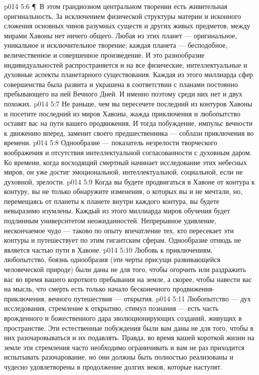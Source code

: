 \vs p014 5:6 \P\ В этом грандиозном центральном творении есть живительная оригинальность. За исключением физической структуры материи и исконного сложения основных чинов разумных существ и других живых предметов, между мирами Хавоны нет ничего общего. Любая из этих планет --- оригинальное, уникальное и исключительное творение; каждая планета --- бесподобное, величественное и совершенное произведение. И это разнообразие индивидуальностей распространяется и на все физические, интеллектуальные и духовные аспекты планетарного существования. Каждая из этого миллиарда сфер совершенства была развита и украшена в соответствии с планами постоянно пребывающего на ней Вечного Дней. И именно поэтому среди них нет и двух похожих.
\vs p014 5:7 Не раньше, чем вы пересечете последний из контуров Хавоны и посетите последний из миров Хавоны, жажда приключения и любопытство оставят вас на пути вашего продвижения. И тогда побуждение, импульс вечности к движению вперед, заменит своего предшественника --- соблазн приключения во времени.
\vs p014 5:8 Однообразие --- показатель незрелости творческого воображения и отсутствия интеллектуальной согласованности с духовным даром. Ко времени, когда восходящий смертный начинает исследование этих небесных миров, он уже достиг эмоциональной, интеллектуальной, социальной, если не духовной, зрелости.
\vs p014 5:9 Когда вы будете продвигаться в Хавоне от контура к контуру, вы не только обнаружите изменения, о которых вы и не мечтали, но, перемещаясь от планеты к планете внутри каждого контура, вы будете невыразимо изумлены. Каждый из этого миллиарда миров обучения будет подлинным университетом неожиданностей. Непрерывное удивление, нескончаемое чудо --- таково по опыту впечатление тех, кто пересекает эти контуры и путешествует по этим гигантским сферам. Однообразие отнюдь не является частью пути в Хавоне.
\vs p014 5:10 Любовь к приключениям, любопытство, боязнь однообразия (эти черты присущи развивающейся человеческой природе) были даны не для того, чтобы огорчить или раздражить вас во время вашего короткого пребывания на земле, а скорее, чтобы навести вас на мысль, что смерть есть только начало бесконечного продвижения\hyp{}приключения, вечного путешествия --- открытия.
\vs p014 5:11 Любопытство --- дух исследования, стремление к открытию, стимул познания --- есть часть врожденного и божественного дара эволюционирующих созданий, живущих в пространстве. Эти естественные побуждения были вам даны не для того, чтобы в них разочаровываться и их подавлять. Правда, во время вашей короткой жизни на земле эти стремления часто необходимо ограничивать и вам не раз приходится испытывать разочарование, но они должны быть полностью реализованы и чудесно удовлетворены в продолжение долгих веков, которые наступят.
